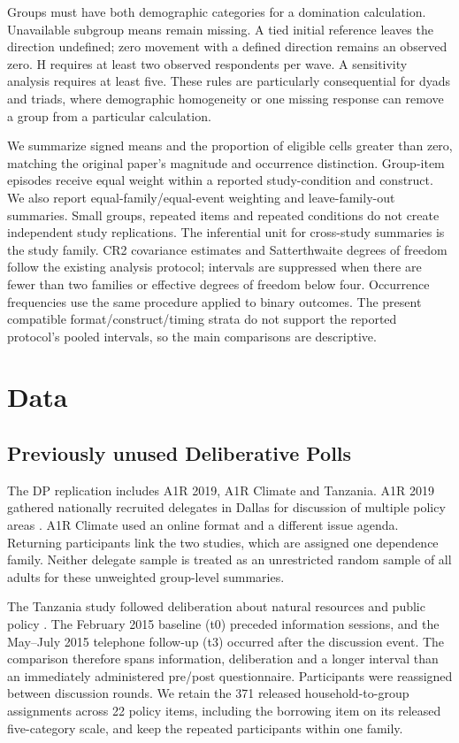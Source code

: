 \documentclass[11pt]{article}
\begin{document}
Groups must have both demographic categories for a domination calculation.
Unavailable subgroup means remain missing. A tied initial reference leaves the
direction undefined; zero movement with a defined direction remains an observed
zero. H requires at least two observed respondents per wave. A sensitivity analysis
requires at least five. These rules are particularly consequential for dyads and
triads, where demographic homogeneity or one missing response can remove a group
from a particular calculation.

We summarize signed means and the proportion of eligible cells greater than zero,
matching the original paper's magnitude and occurrence distinction. Group-item
episodes receive equal weight within a reported study-condition and construct.
We also report equal-family/equal-event weighting and leave-family-out summaries.
Small groups, repeated items and repeated conditions do not create independent
study replications. The inferential unit for cross-study summaries is the study
family. CR2 covariance estimates and Satterthwaite degrees of freedom follow the
existing analysis protocol; intervals are suppressed when there are fewer than
two families or effective degrees of freedom below four. Occurrence frequencies
use the same procedure applied to binary outcomes. The present compatible
format/construct/timing strata do not support the reported protocol's pooled
intervals, so the main comparisons are descriptive.

\section{Data}
\subsection{Previously unused Deliberative Polls}
The DP replication includes A1R 2019, A1R Climate and Tanzania. A1R 2019 gathered
nationally recruited delegates in Dallas for discussion of multiple policy areas
\citep{a1r}. A1R Climate used an online format and a different issue agenda.
Returning participants link the two studies, which are assigned one dependence
family. Neither delegate sample is treated as an unrestricted random sample of
all adults for these unweighted group-level summaries.

The Tanzania study followed deliberation about natural resources and public policy
\citep{tanzania}. The February 2015 baseline (t0) preceded information sessions, and
the May--July 2015 telephone follow-up (t3) occurred after the discussion event. The comparison therefore spans information,
deliberation and a longer interval than an immediately administered pre/post
questionnaire. Participants were reassigned between discussion rounds. We retain
the 371 released household-to-group assignments across 22 policy items, including
the borrowing item on its released five-category scale, and keep the repeated
participants within one family.
\end{document}
